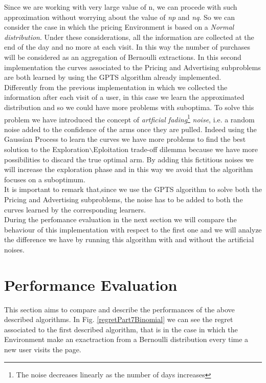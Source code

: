 Since we are working with very large value of n, we can procede with such approximation without worrying about the value of \textit{np} and \textit{nq}.
So we can consider the case in which the pricing Environment is based on a \textit{Normal distribution}. Under these considerations, all the information are collected at the end of the day and no more at each visit. In this way the number of purchases will be considered as an aggregation of Bernoulli extractions.
In this second implementation the curves associated to the Pricing and Advertising subproblems are both learned by using the GPTS algorithm already implemented.\\
Differently from the previous implementation in which we collected the information after each visit of a user, in this case we learn the approximated distribution and so we could have more problems with suboptima. To solve this problem we have introduced the concept of \textit{artficial fading}\footnote{The noise decreases linearly as the number of days increases} \textit{noise}, i.e. a random noise added to the confidence of the arms once they are pulled. Indeed using the Gaussian Process to learn the curves we have more problems to find the best solution to the Exploration$\backslash$Eploitation trade-off dilemma because we have more possibilities to discard the true optimal arm. By adding this fictitious noises we will increase the exploration phase and in this way we avoid that the algorithm focuses on a suboptimum.\\ It is important to remark that,since we use the GPTS algorithm to solve both the Pricing and Advertising subproblems, the noise has to be added to both the curves learned by the corresponding learners.\\ During the perfomance evaluation in the next section we will compare the behaviour of this implementation with respect to the first one and we will analyze the difference we have by running this algorithm with and without the artificial noises.


\section{Performance Evaluation}
This section aims to compare and describe the performances of the above described algorithms. In Fig. \ref{regretPart7Binomial} we can see the regret associated to the first described algorithm, that is in the case in which the Environment make an exactraction from a Bernoulli distribution every time a new user visits the page.

